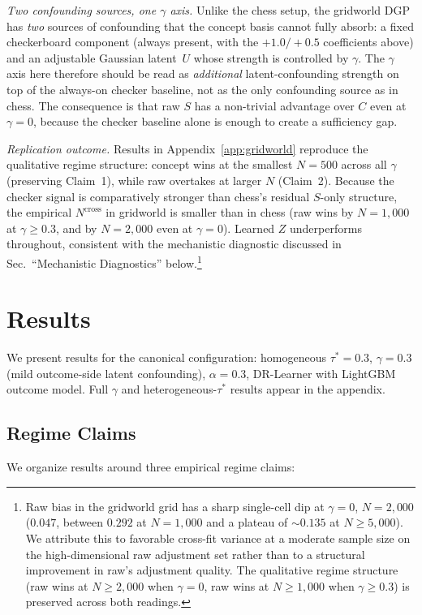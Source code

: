 \documentclass[11pt]{article}
\begin{document}
\textit{Two confounding sources, one $\gamma$ axis.} Unlike the chess setup, the
gridworld DGP has \emph{two} sources of confounding that the concept basis
cannot fully absorb: a fixed checkerboard component (always present, with the
$+1.0/+0.5$ coefficients above) and an adjustable Gaussian latent~$U$ whose
strength is controlled by $\gamma$. The $\gamma$ axis here therefore should be
read as \emph{additional} latent-confounding strength on top of the always-on
checker baseline, not as the only confounding source as in chess. The
consequence is that raw $S$ has a non-trivial advantage over $C$ even at
$\gamma=0$, because the checker baseline alone is enough to create a sufficiency
gap.

\textit{Replication outcome.} Results in Appendix~\ref{app:gridworld} reproduce
the qualitative regime structure: concept wins at the smallest $N{=}500$ across
all $\gamma$ (preserving Claim~1), while raw overtakes at larger $N$ (Claim~2).
Because the checker signal is comparatively stronger than chess's residual
$S$-only structure, the empirical $N^{\text{cross}}$ in gridworld is smaller
than in chess (raw wins by $N{=}1{,}000$ at $\gamma\geq 0.3$, and by $N{=}2{,}000$
even at $\gamma=0$). Learned $Z$ underperforms throughout, consistent with the
mechanistic diagnostic discussed in Sec.~``Mechanistic Diagnostics''
below.\footnote{Raw bias in the gridworld grid has a sharp single-cell dip at
$\gamma{=}0$, $N{=}2{,}000$ ($0.047$, between $0.292$ at $N{=}1{,}000$ and a
plateau of $\sim\!0.135$ at $N\geq 5{,}000$). We attribute this to favorable
cross-fit variance at a moderate sample size on the high-dimensional raw
adjustment set rather than to a structural improvement in raw's adjustment
quality. The qualitative regime structure (raw wins at $N\geq 2{,}000$ when
$\gamma{=}0$, raw wins at $N\geq 1{,}000$ when $\gamma\geq 0.3$) is preserved
across both readings.}

\section*{Results}

We present results for the canonical configuration: homogeneous $\tau^* = 0.3$,
$\gamma = 0.3$ (mild outcome-side latent confounding), $\alpha = 0.3$, DR-Learner
with LightGBM outcome model. Full $\gamma$ and heterogeneous-$\tau^*$ results appear
in the appendix.

\subsection*{Regime Claims}
We organize results around three empirical regime claims:
\end{document}
